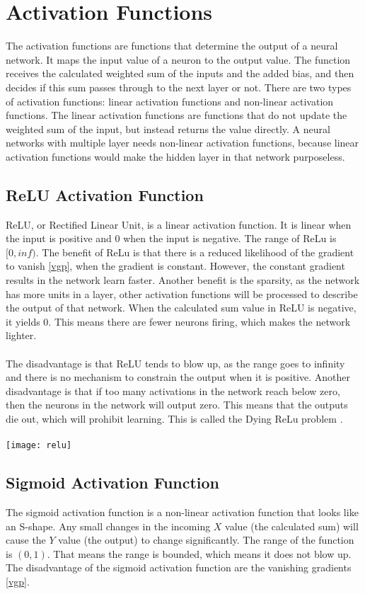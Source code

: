 \section{Activation Functions}
The activation functions are functions that determine the output of a neural network. It maps the input value of a neuron to the output value. The function receives the calculated weighted sum of the inputs and the added bias, and then decides if this sum passes through to the next layer or not.
There are two types of activation functions: linear activation functions and non-linear activation functions. The linear activation functions are functions that do not update the weighted sum of the input, but instead returns the value directly. A neural networks with multiple layer needs non-linear activation functions, because linear activation functions would make the hidden layer in that network purposeless. 

\subsection{ReLU Activation Function}
ReLU, or Rectified Linear Unit, is a linear activation function. It is linear when the input is positive and 0 when the input is negative. The range of ReLu is $[0, inf)$. The benefit of ReLu is that there is a reduced likelihood of the gradient to vanish \ref{vgp}, when the gradient is constant. However, the constant gradient results in the network learn faster. Another benefit is the sparsity, as the network has more units in a layer, other activation functions will be processed to describe the output of that network. When the calculated sum value in ReLU is negative, it yields 0. This means there are fewer neurons firing, which makes the network lighter.\\\\ 
The disadvantage is that ReLU tends to blow up, as the range goes to infinity and there is no mechanism to constrain the output when it is positive. Another disadvantage is that if too many activations in the network reach below zero, then the neurons in the network will output zero. This means that the outputs die out, which will prohibit learning. This is called the Dying ReLu problem \cite{Dying_ReLU}.\\\\
\texttt{[image: relu]}

\subsection{Sigmoid Activation Function}
The sigmoid activation function is a non-linear activation function that looks like an S-shape. Any small changes in the incoming $X$ value (the calculated sum) will cause the $Y$ value (the output) to change significantly. The range of the function is $(0,1)$. That means the range is bounded, which means it does not blow up. The disadvantage of the sigmoid activation function are the vanishing gradients \ref{vgp}.\\


